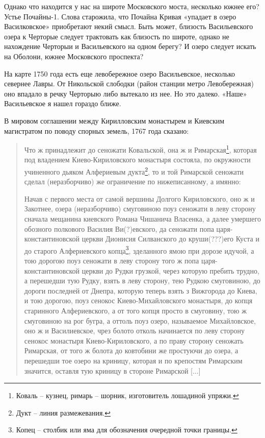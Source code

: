 Однако что находится у нас на широте Московского моста, несколько южнее его? Устье Почайны-1. Слова старожила, что Почайна Кривая «упадает в озеро Василковское» приобретают некий смысл. Быть может, близость Васильевского озера к Черторые следует трактовать как близость по широте, однако не нахождение Черторыи и Васильевского на одном берегу? И озеро следует искать на Оболони, южнее Московского проспекта?

На карте 1750 года есть еще левобережное озеро Васильевское, несколько севернее Лавры. От Никольской слободки (район станции метро Левобережная) оно впадало в речку Черторыю либо вытекало из нее. Но это далеко. «Наше» Васильевское я нашел гораздо ближе.

В мировом соглашении между  Кирилловским монастырем и Киевским магистратом по поводу спорных земель, 1767 года сказано:

\begin{quotation}
Что ж принадлежит до сеножати Ковальской, она ж и Римарская\footnote{Коваль – кузнец, римарь – шорник, изготовитель лошадиной упряжи.}, которая под владением Киево-Кириловского монастыря состояла, по окружности учиненного дьяком Алфериевым дукта\footnote{Дукт – линия размежевания.}, то и той Римарской сеножати сделал (неразборчиво) же ограничение по нижеписанному, а имянно:

Начав с первого места от самой вершины Долгого Кириловского, оно ж и Закотнее, озера (неразборчиво) смуговиною поуз сеножати в леву сторону сначала мещанина киевского Романа Чишанича Власенка, а далее умершего обозного полкового Василия Ви(?)евского, да сеножати попа царя-константиновской церкви Дионисия Силванского до круши(???)его Куста и до старого Алфериевского копца\footnote{Копец – столбик или яма для обозначения очередной точки границы.}, зделанного ямою при дорозе идучой, а тою дорогою поуз сеножати в леву сторону того ж попа царя-константиновской церкви до Рудки грузкой, через которую пребить трудно, а перешедши тую Рудку, взять в леву сторону, тею Рудкою смуговиною, до дороги последней от Днепра, которую теперь взять з Вижгорода до Киева, и тою дорогою, поуз сенокос Киево-Михайловского монастыря, до копця старинного Алфериевского, а от того копця просто в смуговину, тою ж смуговиною на рог бугра, а оттоль поуз озеро, называемое Михайловское, оно ж и Василиевское, чрез болото отколь начинается по леву сторону сенокос монастыря Киево-Кириловского, а по праву сторону сеножать Римарская, от того ж болота до ковтобини же простуючи до озера, а перешедши тое озеро на криницу, которая и по крепостям Римарским значится, оставля тую криницу в стороне Римарской [...]
\end{quotation}

